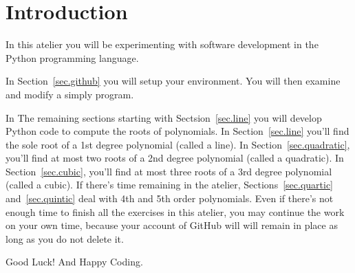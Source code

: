 \section{Introduction}
\label{sec.intro}

In this atelier you will be experimenting with software development
in the Python programming language.

In Section~\ref{sec.github} you will setup your environment. You will then examine and modify
a simply  program.

In The remaining sections starting with Sectsion~\ref{sec.line} you
will develop Python code to compute the roots of polynomials.  In
Section~\ref{sec.line} you'll find the sole root of a 1st degree
polynomial (called a line).  In Section~\ref{sec.quadratic}, you'll
find at most two roots of a 2nd degree polynomial (called a
quadratic). In Section~\ref{sec.cubic}, you'll find at most three
roots of a 3rd degree polynomial (called a cubic).  If there's time
remaining in the atelier, Sections~\ref{sec.quartic}
and~\ref{sec.quintic} deal with 4th and 5th order polynomials.  Even
if there's not enough time to finish all the exercises in this
atelier, you may continue the work on your own time, because your
account of GitHub will will remain in place as long as you do not
delete it.

Good Luck! And Happy Coding.


